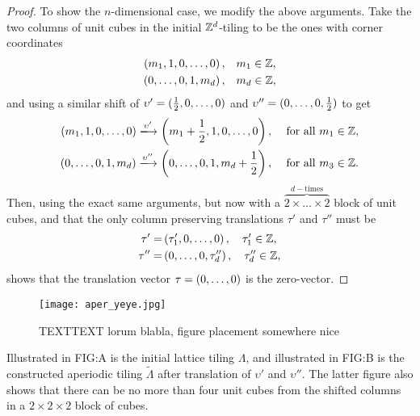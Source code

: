 \documentclass[../thesis.tex]{subfiles}
\begin{document}
\begin{proof}
To show the $n$-dimensional case, we modify the above arguments. Take the two columns of unit cubes in the initial $\mathbb{Z}^d$-tiling to be the ones with corner coordinates
\begin{align*}
    \left(m_1,1,0, \dots,0\right), & \quad m_1 \in \mathbb{Z},\\
    \left(0,\dots,0,1,m_d\right),& \quad m_d \in \mathbb{Z},
\end{align*}
and using a similar shift of $\upsilon' = (\frac{1}{2},0,\dots,0)$ and $\upsilon'' = (0,\dots,0,\frac{1}{2})$ to get
\begin{align*}
    \bracMed{m_1,1,0, \dots,0} \xlongrightarrow[]{\upsilon'} \bracMed{m_1+\frac{1}{2}, 1, 0, \dots, 0}, \quad  &\text{ for all } m_1 \in \Z,\\
    \bracMed{0,\dots,0,1,m_d} \xlongrightarrow[]{\upsilon''} \bracMed{0, \dots, 0, 1, m_d+\frac{1}{2}},    \quad  &\text{ for all }  m_3 \in \Z.
\end{align*}
Then, using the exact same arguments, but now with a $\overbrace{2\times \dots \times 2}^{d-\text{times}}$ block of unit cubes, and that the only column preserving translations $\tau'$ and $\tau''$ must be
\begin{align*}
    \tau' =& \left(\tau'_1,0,\dots,0 \right), \quad \tau'_1 \in \mathbb{Z},\\
    \tau'' =& \left(0,\dots,0,\tau''_d\right), \quad \tau''_d \in \mathbb{Z},
\end{align*}
shows that the translation vector $\tau=(0,\dots,0)$ is the zero-vector.
\end{proof}

\begin{figure*}[h!]
    \centering
    \texttt{[image: aper\_yeye.jpg]}
    \caption{TEXTTEXT lorum blabla, figure placement somewhere nice}
    \label{fig:aperi_cube}
\end{figure*}

Illustrated in FIG:A is the initial lattice tiling $\Lambda$, and illustrated in FIG:B is the constructed aperiodic tiling $\widetilde{\Lambda}$ after translation of $\upsilon'$ and $\upsilon''$. The latter figure also shows that there can be no more than four unit cubes from the shifted columns in a $2\times 2\times 2$ block of cubes. 
\end{document}
